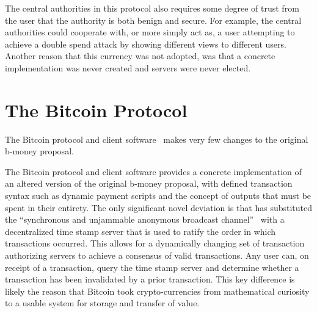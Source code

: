 The central authorities in this protocol also requires some degree of trust from the user that the authority is both benign and secure. For example, the central authorities could cooperate with, or more simply act as, a user attempting to achieve a double spend attack by showing different views to different users. Another reason that this currency was not adopted, was that a concrete implementation was never created and servers were never elected.

\section{The Bitcoin Protocol}
The Bitcoin protocol and client software~\textcite{satoshi} makes very few changes to the original b-money\cite{b-money} proposal. 

The Bitcoin protocol and client software provides a concrete implementation of an altered version of the original b-money proposal, with defined transaction syntax such as dynamic payment scripts and the concept of outputs that must be spent in their entirety.  The only significant novel deviation is that \textcite{satoshi} has substituted the ``synchronous and unjammable anonymous broadcast channel''~\cite{b-money} with a decentralized time stamp server that is used to ratify the order in which transactions occurred.  This allows for a dynamically changing set of transaction authorizing servers to achieve a consensus of valid transactions. Any user can, on receipt of a transaction, query the time stamp server and determine whether a transaction has been invalidated by a prior transaction. This key difference is likely the reason that Bitcoin took crypto-currencies from mathematical curiosity to a usable system for storage and transfer of value.

